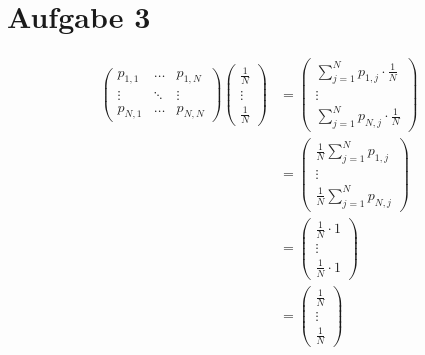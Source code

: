\documentclass[10pt,a4paper,parskip=half]{scrartcl}
\begin{document}
\section*{Aufgabe 3}

\begin{align*}
\begin{pmatrix} p_{1,1} & \dots & p_{1,N} \\ \vdots & \ddots & \vdots \\ p_{N,1} & \dots & p_{N,N} \end{pmatrix}\begin{pmatrix} \frac 1 N \\ \vdots \\ \frac 1 N \end{pmatrix} &= \begin{pmatrix} \sum_{j=1}^{N} p_{1,j} \cdot \frac 1 N \\ \vdots \\ \sum_{j=1}^{N} p_{N,j} \cdot \frac 1 N \end{pmatrix} \\
&= \begin{pmatrix} \frac 1 N \sum_{j=1}^{N} p_{1,j} \\ \vdots \\ \frac 1 N \sum_{j=1}^{N} p_{N,j} \end{pmatrix}\\
&= \begin{pmatrix} \frac 1 N \cdot 1 \\ \vdots \\ \frac 1 N \cdot 1 \end{pmatrix}
\\
&= \begin{pmatrix} \frac 1 N \\ \vdots \\ \frac 1 N \end{pmatrix}
\end{align*}
\end{document}
